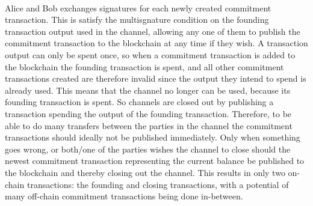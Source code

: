 \\
Alice and Bob exchanges signatures for each newly created commitment transaction.
This is satisfy the multisgnature condition on the founding transaction output used in the channel, allowing any one of them to publish the commitment transaction to the blockchain at any time if they wish. A transaction output can only be spent once, so when a commitment transaction is added to the blockchain the founding transaction is spent, and all other commitment transactions created are therefore invalid since the output they intend to spend is already used. This means that the channel no longer can be used, because its founding transaction is spent. So channels are closed out by publishing a transaction spending the output of the founding transaction. Therefore, to be able to do many transfers between the parties in the channel the commitment transactions should ideally not be published immediately. Only when something goes wrong, or both/one of the parties wishes the channel to close should the newest commitment transaction representing the current balance be published to the blockchain and thereby closing out the channel. This results in only two on-chain transactions: the founding and closing transactions, with a potential of many off-chain commitment transactions being done in-between.
\\

